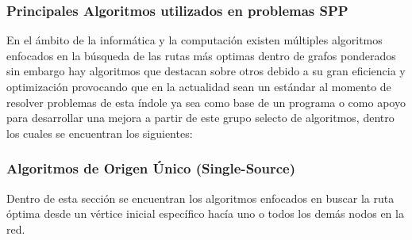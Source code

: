 \subsubsection{Principales Algoritmos utilizados en problemas SPP}

En el ámbito de la informática y la computación existen múltiples algoritmos enfocados en la búsqueda de las rutas más optimas dentro de grafos ponderados sin embargo hay algoritmos que destacan sobre otros debido a su gran eficiencia y optimización provocando que en la actualidad sean un estándar al momento de resolver problemas de esta índole ya sea como base de un programa o como apoyo para desarrollar una mejora a partir de este grupo selecto de algoritmos, dentro los cuales se encuentran los siguientes: 

\subsubsection{Algoritmos de Origen Único (Single-Source)}
Dentro de esta sección se encuentran los algoritmos enfocados en buscar la ruta óptima desde un vértice inicial específico hacía uno o todos los demás nodos en la red. 

